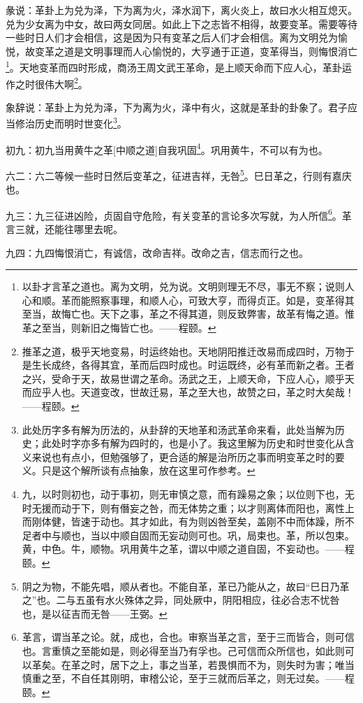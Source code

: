 \documentclass[12pt,oneside]{book}
\begin{document}
彖说：革卦上为兑为泽，下为离为火，泽水润下，离火炎上，故曰水火相互熄灭。兑为少女离为中女，故曰两女同居。如此上下之志皆不相得，故要变革。需要等待一些时日人们才会相信，这是因为只有变革之后人们才会相信。离为文明兑为愉悦，故变革之道是文明事理而人心愉悦的，大亨通于正道，变革得当，则悔恨消亡\footnote{以卦才言革之道也。离为文明，兑为说。文明则理无不尽，事无不察；说则人心和顺。革而能照察事理，和顺人心，可致大亨，而得贞正。如是，变革得其至当，故悔亡也。天下之事，革之不得其道，则反致弊害，故革有悔之道。惟革之至当，则新旧之悔皆亡也。——程颐。}。天地变革而四时形成，商汤王周文武王革命，是上顺天命而下应人心，革卦运作之时很伟大啊\footnote{推革之道，极乎天地变易，时运终始也。天地阴阳推迁改易而成四时，万物于是生长成终，各得其宜，革而后四时成也。时运既终，必有革而新之者。王者之兴，受命于天，故易世谓之革命。汤武之王，上顺天命，下应人心，顺乎天而应乎人也。天道变改，世故迁易，革之至大也，故赞之曰，革之时大矣哉！——程颐。}。

象辞说：革卦上为兑为泽，下为离为火，泽中有火，这就是革卦的卦象了。君子应当修治历史而明时世变化\footnote{此处历字多有解为历法的，从卦辞的天地革和汤武革命来看，此处当解为历史；此处时字亦多有解为四时的，也是小了。我这里解为历史和时世变化从含义来说也有点小，但勉强够了，更合适的解是治所历之事而明变革之时的要义。只是这个解所谈有点抽象，放在这里可作参考。}。

初九：初九当用黄牛之革[中顺之道]自我巩固\footnote{九，以时则初也，动于事初，则无审慎之意，而有躁易之象；以位则下也，无时无援而动于下，则有僭妄之咎，而无体势之重；以才则离体而阳也，离性上而刚体健，皆速于动也。其才如此，有为则凶咎至矣，盖刚不中而体躁，所不足者中与顺也，当以中顺自固而无妄动则可也。巩，局束也。革，所以包束。黄，中色。牛，顺物。巩用黄牛之革，谓以中顺之道自固，不妄动也。——程颐。}。巩用黄牛，不可以有为也。


六二：六二等候一些时日然后变革之，征进吉祥，无咎\footnote{阴之为物，不能先唱，顺从者也。不能自革，革已乃能从之，故曰“巳日乃革之”也。二与五虽有水火殊体之异，同处厥中，阴阳相应，往必合志不忧咎也，是以征吉而无咎——王弼。}。巳日革之，行则有嘉庆也。

九三：九三征进凶险，贞固自守危险，有关变革的言论多次写就，为人所信\footnote{革言，谓当革之论。就，成也，合也。审察当革之言，至于三而皆合，则可信也。言重慎之至能如是，则必得至当乃有孚也。己可信而众所信也，如此则可以革矣。在革之时，居下之上，事之当革，若畏惧而不为，则失时为害；唯当慎重之至，不自任其刚明，审稽公论，至于三就而后革之，则无过矣。——程颐。}。革言三就，还能往哪里去呢。

九四：九四悔恨消亡，有诚信，改命吉祥。改命之吉，信志而行之也。
\end{document}
